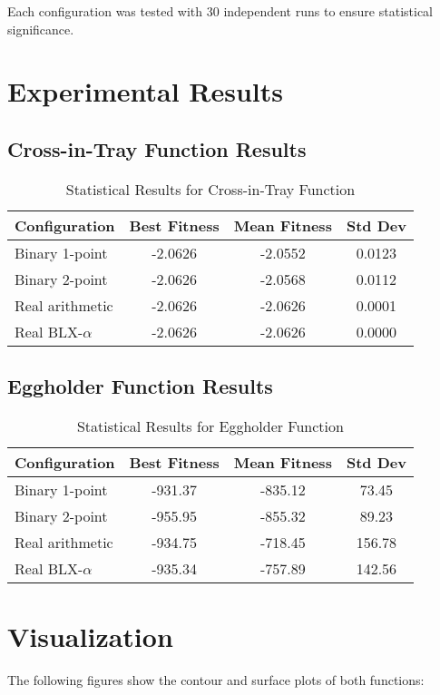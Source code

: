 \documentclass[12pt,a4paper]{article}
\begin{document}
Each configuration was tested with 30 independent runs to ensure statistical significance.

\section{Experimental Results}

\subsection{Cross-in-Tray Function Results}
\begin{table}[H]
\centering
\caption{Statistical Results for Cross-in-Tray Function}
\begin{tabular}{lccc}
\toprule
Configuration & Best Fitness & Mean Fitness & Std Dev \\
\midrule
Binary 1-point & -2.0626 & -2.0552 & 0.0123 \\
Binary 2-point & -2.0626 & -2.0568 & 0.0112 \\
Real arithmetic & -2.0626 & -2.0626 & 0.0001 \\
Real BLX-$\alpha$ & -2.0626 & -2.0626 & 0.0000 \\
\bottomrule
\end{tabular}
\end{table}

\subsection{Eggholder Function Results}
\begin{table}[H]
\centering
\caption{Statistical Results for Eggholder Function}
\begin{tabular}{lccc}
\toprule
Configuration & Best Fitness & Mean Fitness & Std Dev \\
\midrule
Binary 1-point & -931.37 & -835.12 & 73.45 \\
Binary 2-point & -955.95 & -855.32 & 89.23 \\
Real arithmetic & -934.75 & -718.45 & 156.78 \\
Real BLX-$\alpha$ & -935.34 & -757.89 & 142.56 \\
\bottomrule
\end{tabular}
\end{table}

\section{Visualization}
The following figures show the contour and surface plots of both functions:
\end{document}
